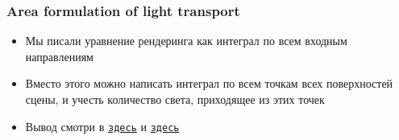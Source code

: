 \documentclass[10pt]{beamer}
\begin{document}
\begin{frame}
\frametitle{Area formulation of light transport}
\begin{itemize}
\item Мы писали уравнение рендеринга как интеграл по всем входным направлениям
\pause
\item Вместо этого можно написать интеграл по всем точкам всех поверхностей сцены, и учесть количество света, приходящее из этих точек
\pause
\item Вывод смотри в \href{https://www.cg.tuwien.ac.at/courses/Rendering/2020/slides/04_The_Rendering_Equation_v20200515.pdf}{\texttt{здесь}} и \href{https://www.dgp.toronto.edu/~lessig/dissertation/files/area_formulation.pdf}{\texttt{здесь}}
\end{itemize}
\end{frame}
\end{document}
